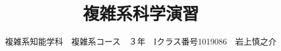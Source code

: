 \documentclass[10pt, a4paper]{jsarticle}
\title{複雑系科学演習} %
\begin{document}
\author{複雑系知能学科　複雑系コース　３年　Iクラス番号1019086　岩上慎之介}
\maketitle %
\newpage





\end{document}
